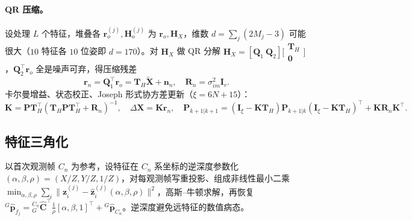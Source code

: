 \paragraph{QR 压缩。}
设处理 $L$ 个特征，堆叠各 $\mathbf{r}_o^{(j)},\mathbf{H}_o^{(j)}$ 为 $\mathbf{r}_o,\mathbf{H}_X$，维数 $d=\sum_j(2M_j-3)$ 可能很大（$10$ 特征各 $10$ 位姿即 $d=170$）。对 $\mathbf{H}_X$ 做 QR 分解 $\mathbf{H}_X=[\mathbf{Q}_1\ \mathbf{Q}_2]\big[\begin{smallmatrix}\mathbf{T}_H\\ \mathbf{0}\end{smallmatrix}\big]$，$\mathbf{Q}_2^\top\mathbf{r}_o$ 全是噪声可弃，得压缩残差
\begin{equation}
  \mathbf{r}_n=\mathbf{Q}_1^\top\mathbf{r}_o=\mathbf{T}_H\tilde{\mathbf{X}}+\mathbf{n}_n,
  \quad \mathbf{R}_n=\sigma_{im}^2\mathbf{I}_r.
  \label{eq:vio-msckf-qr}
\end{equation}
卡尔曼增益、状态校正、Joseph 形式协方差更新（$\xi=6N+15$）：
\begin{equation}
  \mathbf{K}=\mathbf{P}\mathbf{T}_H^\top(\mathbf{T}_H\mathbf{P}\mathbf{T}_H^\top+\mathbf{R}_n)^{-1},
  \quad \Delta\mathbf{X}=\mathbf{K}\mathbf{r}_n,
  \quad \mathbf{P}_{k+1|k+1}=(\mathbf{I}_\xi-\mathbf{K}\mathbf{T}_H)\mathbf{P}_{k+1|k}(\mathbf{I}_\xi-\mathbf{K}\mathbf{T}_H)^\top+\mathbf{K}\mathbf{R}_n\mathbf{K}^\top.
  \label{eq:vio-msckf-ekf}
\end{equation}

\subsection{特征三角化}
\label{sec:vio-msckf-tri}

以首次观测帧 $C_n$ 为参考，设特征在 $C_n$ 系坐标的逆深度参数化 $(\alpha,\beta,\rho)=(X/Z,Y/Z,1/Z)$，对每观测帧写重投影、组成非线性最小二乘 $\min_{\alpha,\beta,\rho}\sum_i\|\mathbf{z}_i^{(j)}-\hat{\mathbf{z}}_i^{(j)}(\alpha,\beta,\rho)\|^2$，高斯--牛顿求解，再恢复 ${}^G\hat{\mathbf{p}}_{f_j}={}^{C_n}_G\hat{\mathbf{C}}^\top\tfrac{1}{\rho}[\alpha,\beta,1]^\top+{}^G\hat{\mathbf{p}}_{C_n}$。逆深度避免远特征的数值病态。

